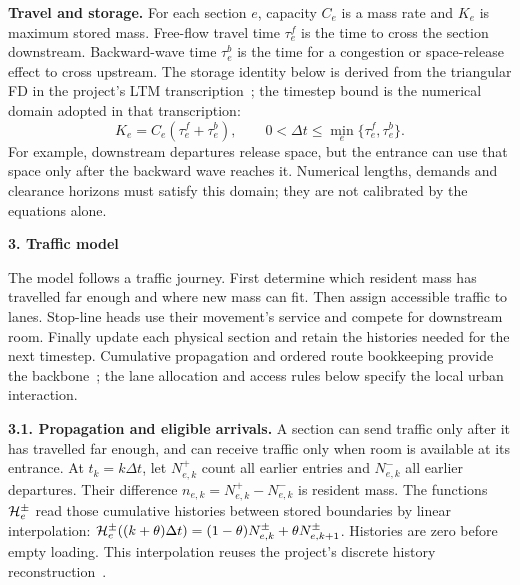 \documentclass[10pt,a4paper]{article}
\newcommand{\head}[1]{\par\vspace{4pt}\noindent\textbf{#1}\par\nobreak\vspace{1pt}}
\newcommand{\rev}[1]{{\color{revisionred}#1}}
\begin{document}
\par\begin{samepage}
\textbf{Travel and storage.} For each section $e$, capacity $C_e$ is a
mass rate and $K_e$ is maximum stored mass. Free-flow travel time
$\tau^f_e$ is the time to cross the section downstream. Backward-wave
time $\tau^b_e$ is the time for a congestion or space-release effect to
cross upstream. The storage identity below is
\rev{derived from the triangular FD in the project's LTM transcription~\cite{m0}};
the timestep bound is \rev{the numerical domain adopted in that transcription}:
\begin{equation}
 K_e=C_e(\tau^f_e+\tau^b_e),\qquad
 0<\Delta t\leq\min_e\{\tau^f_e,\tau^b_e\}.
 \label{eq:compact-domain}
\end{equation}
For example, downstream departures release space, but the entrance can
use that space only after the backward wave reaches it. Numerical
lengths, demands and clearance horizons must satisfy this domain;
they are not calibrated by the equations alone.
\par\end{samepage}

\head{3. Traffic model}
The model follows a traffic journey. First determine which resident
mass has travelled far enough and where new mass can fit. Then assign
accessible traffic to lanes. Stop-line heads use their movement's service
and compete for downstream room. Finally update each physical section
and retain the histories needed for the next timestep.
Cumulative propagation and ordered route bookkeeping provide the
backbone~\cite{m0,m1}; the lane allocation and access rules below specify
the local urban interaction.

\textbf{3.1. Propagation and eligible arrivals.}
A section can send traffic only after it has travelled far enough, and
can receive traffic only when room is available at its entrance.
At $t_k=k\Delta t$, let $N^+_{e,k}$ count all earlier entries and
$N^-_{e,k}$ all earlier departures. Their difference
$n_{e,k}=N^+_{e,k}-N^-_{e,k}$ is resident mass.
The functions ${\cal H}^{\pm}_e$ read those cumulative histories between
stored boundaries by linear interpolation:
${\cal H}^{\pm}_e((k+\theta)\Delta t)
=(1-\theta)N^\pm_{e,k}+\theta N^\pm_{e,k+1}$.
Histories are zero before empty loading.
\rev{This interpolation reuses the project's discrete history reconstruction~\cite{m0,m1}.}
\end{document}
